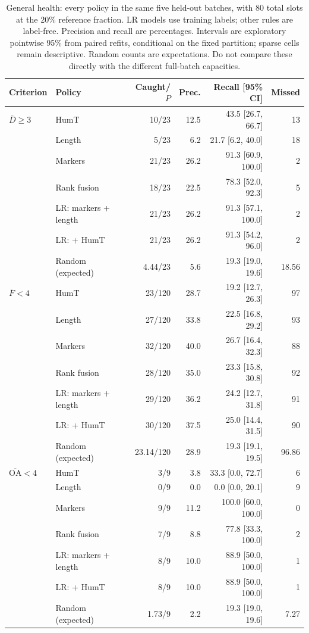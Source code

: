 \begin{table}[t]
\centering\small
\caption{General health: every policy in the same five held-out batches, with 80 total slots at the 20\% reference fraction. LR models use training labels; other rules are label-free. Precision and recall are percentages. Intervals are exploratory pointwise 95\% from paired refits, conditional on the fixed partition; sparse cells remain descriptive. Random counts are expectations. Do not compare these directly with the different full-batch capacities.}
\label{tab:held_health}
\begin{tabular}{llrrrr}
\toprule
Criterion & Policy & Caught/$P$ & Prec. & Recall [95\% CI] & Missed \\
\midrule
$\overline D\geq3$ & HumT & 10/23 & 12.5 & 43.5 [26.7, 66.7] & 13 \\
 & Length & 5/23 & 6.2 & 21.7 [6.2, 40.0] & 18 \\
 & Markers & 21/23 & 26.2 & 91.3 [60.9, 100.0] & 2 \\
 & Rank fusion & 18/23 & 22.5 & 78.3 [52.0, 92.3] & 5 \\
 & LR: markers + length & 21/23 & 26.2 & 91.3 [57.1, 100.0] & 2 \\
 & LR: + HumT & 21/23 & 26.2 & 91.3 [54.2, 96.0] & 2 \\
 & Random (expected) & 4.44/23 & 5.6 & 19.3 [19.0, 19.6] & 18.56 \\
$\overline F<4$ & HumT & 23/120 & 28.7 & 19.2 [12.7, 26.3] & 97 \\
 & Length & 27/120 & 33.8 & 22.5 [16.8, 29.2] & 93 \\
 & Markers & 32/120 & 40.0 & 26.7 [16.4, 32.3] & 88 \\
 & Rank fusion & 28/120 & 35.0 & 23.3 [15.8, 30.8] & 92 \\
 & LR: markers + length & 29/120 & 36.2 & 24.2 [12.7, 31.8] & 91 \\
 & LR: + HumT & 30/120 & 37.5 & 25.0 [14.4, 31.5] & 90 \\
 & Random (expected) & 23.14/120 & 28.9 & 19.3 [19.1, 19.5] & 96.86 \\
$\overline{\mathrm{OA}}<4$ & HumT & 3/9 & 3.8 & 33.3 [0.0, 72.7] & 6 \\
 & Length & 0/9 & 0.0 & 0.0 [0.0, 20.1] & 9 \\
 & Markers & 9/9 & 11.2 & 100.0 [60.0, 100.0] & 0 \\
 & Rank fusion & 7/9 & 8.8 & 77.8 [33.3, 100.0] & 2 \\
 & LR: markers + length & 8/9 & 10.0 & 88.9 [50.0, 100.0] & 1 \\
 & LR: + HumT & 8/9 & 10.0 & 88.9 [50.0, 100.0] & 1 \\
 & Random (expected) & 1.73/9 & 2.2 & 19.3 [19.0, 19.6] & 7.27 \\
\bottomrule
\end{tabular}
\end{table}

